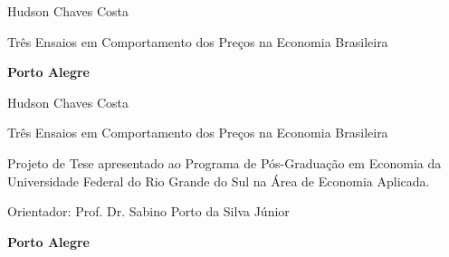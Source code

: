\documentclass[twoside,a4paper,11pt]{report}
\newcommand{\nomedoaluno}{Hudson Chaves Costa}
\newcommand{\titulo}{Três Ensaios em Comportamento dos Preços na Economia Brasileira}
\begin{document}


\pagestyle{empty}

\begin{titlepage}


\begin{center}
{\LARGE \nomedoaluno}
\par
\vspace{200pt}
{\Huge \titulo}
\par
\vfill
\textbf{{\large Porto Alegre}\\
{\large \the\year}}
\end{center}
\end{titlepage}

\cleardoublepage




\thispagestyle{empty}

\begin{center}
{\LARGE \nomedoaluno}
\par
\vspace{200pt}
{\Huge \titulo}
\end{center}
\par
\vspace{90pt}
\hspace*{175pt}\parbox{7.6cm}{{\large Projeto de Tese apresentado ao Programa de Pós-Graduação em Economia da Universidade Federal do Rio Grande do Sul na Área de Economia Aplicada.}}

\par
\vspace{1em}
\hspace*{175pt}\parbox{7.6cm}{{\large Orientador: Prof. Dr. Sabino Porto da Silva Júnior}}

\par
\vfill
\begin{center}
\textbf{{\large Porto Alegre}\\
{\large \the\year}}
\end{center}
\end{document}

